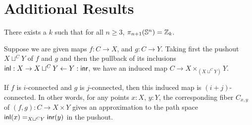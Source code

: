 \documentclass[hott-all.tex]{subfiles}
\begin{document}
\section{Additional Results}
% 
% 
\begin{thm}
There exists a $k$ such that for all $n \ge 3$, $\pi_{n+1}(\Sn ^n) =
\Z_k$.
\end{thm}
% 
% 
% 
\begin{thm}
  Suppose we are given maps $f : C  \rightarrow X$, and $g : C \rightarrow Y$. Taking first the pushout $X \sqcup^C Y $ of $f$ and $g$ and then the pullback of its inclusions $\inl : X \rightarrow X \sqcup^C Y \leftarrow Y : \inr$, we have an induced map $C \to X \times_{(X \sqcup^C Y)} Y$.

  If $f$ is $i$-connected and $g$ is $j$-connected, then this induced map is $(i+j)$-connected. In other words, for any points $x:X$, $y:Y$, the corresponding fiber $C_{x,y}$ of $(f,g) : C \to X \times Y $ gives an approximation to the path space $\id[X \sqcup^C Y]{\inl(x)}{\inr(y)}$ in the pushout.
\end{thm}
% 
\end{document}
